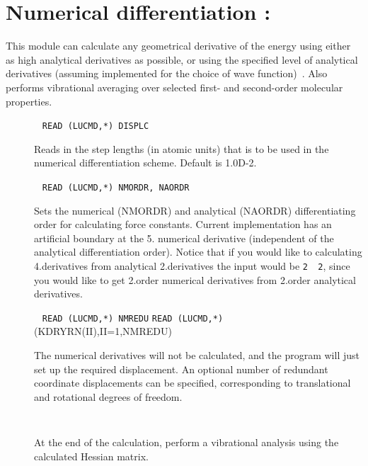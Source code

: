 \section{Numerical differentiation : }\label{sec:nmddrv}

This module can calculate any geometrical derivative of the energy
using either as high analytical derivatives as possible, or using the
specified level of analytical derivatives (assuming implemented for
the choice of wave function)~\cite{numder}. Also performs vibrational averaging over
selected first- and second-order molecular properties.

\begin{description}

\item[]\verb| |\newline
\verb|READ (LUCMD,*) DISPLC|

Reads in the step lengths (in atomic units) that is to be used in the
numerical differentiation scheme. Default is 1.0D-2.

\item[]\verb| |\newline
\verb|READ (LUCMD,*) NMORDR, NAORDR|

Sets the numerical (NMORDR) and analytical (NAORDR) differentiating
order for calculating force constants. Current implementation has an
artificial boundary at the 5. numerical derivative (independent of the
analytical differentiation order). Notice that if you would like to
calculating 4.derivatives from analytical 2.derivatives the input
would be \verb|2  2|, since you would like to get 2.order numerical
derivatives from 2.order analytical derivatives.

\item[]\verb| |\newline
\verb|READ (LUCMD,*) NMREDU|\newline
\verb|READ (LUCMD,*)| (KDRYRN(II),II=1,NMREDU)

The numerical derivatives will not be calculated, and the program will
just set up the required displacement. An optional number of redundant
coordinate displacements can be specified, corresponding to translational and
rotational degrees of freedom.

\item[]\verb| |\newline

At the end of the calculation, perform a vibrational analysis using
the calculated Hessian matrix.


\end{description}
